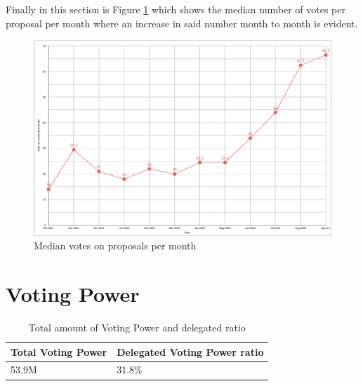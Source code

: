 \documentclass[MSE,Master,english]{twbook}%
\begin{document}
Finally in this section is Figure \ref{fig:median_votes} which shows the median number of votes per proposal per month where an increase in said number month to month is evident.
\begin{figure}[H]
  \centering
  \includegraphics[width=\textwidth]{metrics/median_votes.png}
  \caption{Median votes on proposals per month}
  \label{fig:median_votes}
\end{figure}


\section{Voting Power}
\begin{center}
  \begin{table}[H]
    \begin{tabular}{ | m{20em} | m{20em} | }
      \hline
      \textbf{Total Voting Power} & \textbf{Delegated Voting Power ratio} \\
      \hline
      53.9M & 31.8\% \\
      \hline
    \end{tabular}
    \caption{Total amount of Voting Power and delegated ratio}
    \label{table:VP}
  \end{table}
\end{center}
\end{document}
